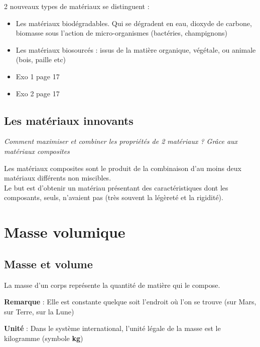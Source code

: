 \documentclass[a4paper,12pt]{article}
\begin{document}
2 nouveaux types de matériaux se distinguent : 
\begin{itemize}[noitemsep]
  \item Les matériaux biodégradables. Qui se dégradent en eau, dioxyde de carbone, biomasse sous l’action de micro-organismes (bactéries, champignons) 
  \item Les matériaux biosourcés : issus de la matière organique, végétale, ou animale (bois, paille etc)
\end{itemize}


\begin{tcolorbox}[colback=blue!10!white, colframe=blue!75!black, title=Exemples - Application]
  \begin{itemize}[noitemsep]
    \item Exo 1 page 17
    \item Exo 2 page 17
  \end{itemize}
\end{tcolorbox}

\subsection{Les matériaux innovants}

\textit{Comment maximiser et combiner les propriétés de 2 matériaux ? Grâce aux matériaux composites}

\begin{tcolorbox}[colback=green!10!white, colframe=green!75!black, title=Définition : Matériaux composites]
  Les matériaux composites sont le produit de la combinaison d’au moins deux matériaux différents non miscibles. \\
  Le but est d’obtenir un matériau présentant des caractéristiques dont les composants, seuls, n’avaient pas (très souvent la légèreté et la rigidité).
\end{tcolorbox}

\section{Masse volumique}

\subsection{Masse et volume}

\begin{tcolorbox}
  La masse d'un corps représente la quantité de matière qui le compose. \par
  \textbf{Remarque} : Elle est constante quelque soit l'endroit où l'on se trouve (sur Mars, sur Terre, sur la Lune) \par
  \textbf{Unité} : Dans le système international, l'unité légale de la masse est le kilogramme (symbole \textbf{kg})
  
\end{tcolorbox}
  
\end{document}

